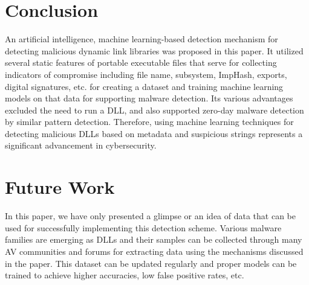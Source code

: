 \documentclass{article}
\begin{document}
\section{Conclusion}

An artificial intelligence, machine learning-based detection mechanism for detecting malicious dynamic link libraries was proposed in this paper. It utilized several static features of portable executable files that serve for collecting indicators of compromise including file name, subsystem, ImpHash, exports, digital signatures, etc. for creating a dataset and training machine learning models on that data for supporting malware detection. Its various advantages excluded the need to run a DLL, and also supported zero-day malware detection by similar pattern detection. Therefore, using machine learning techniques for detecting malicious DLLs based on metadata and suspicious strings represents a significant advancement in cybersecurity.

\section{Future Work}

In this paper, we have only presented a glimpse or an idea of data that can be used for successfully implementing this detection scheme. Various malware families are emerging as DLLs and their samples can be collected through many AV communities and forums for extracting data using the mechanisms discussed in the paper. This dataset can be updated regularly and proper models can be trained to achieve higher accuracies, low false positive rates, etc.
\end{document}
